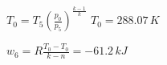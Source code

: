 \( T_0 = T_5 \left( \frac{p_0}{p_5} \right)^{\frac{k-1}{k}} \)  
\( T_0 = 288.07 \, K \)  

\( w_6 = R \frac{T_0 - T_0}{k - n} = -61.2 \, kJ \)
